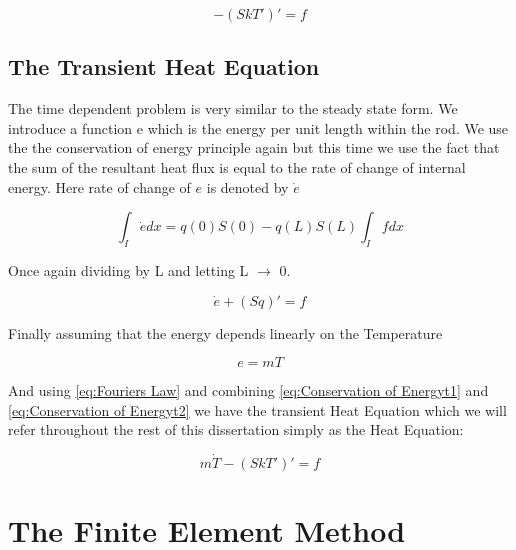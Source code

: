 \documentclass{uonmathreport}
\theoremstyle{definition}
\theoremstyle{problem}
\theoremstyle{theorem}
\begin{document}
\begin{equation}
-(SkT')'= f 	\label{eq:Steady State Heat Equation}
\end{equation}


\subsection{The Transient Heat Equation} \label{subsec:Time Dependent Heat Equation}

The time dependent problem is very similar to the steady state form. We introduce a function e which is the energy per unit length within the rod. We use the the conservation of energy principle again but this time we use the fact that the sum of the resultant heat flux is equal to the rate of change of internal energy. Here rate of change of $e$ is denoted by $\dot{e}$

\begin{equation}
\int_I  \dot{e} dx =   q(0)S(0) - q(L)S(L)  \int_I  f  dx	\label{eq:Conservation of Energyt1}
\end{equation}

Once again dividing by L and letting L $\rightarrow$ 0.

\begin{equation}
\dot{e} + (Sq)' = f	\label{eq:Conservation of Energyt2}
\end{equation}

Finally assuming that the energy depends linearly on the Temperature

\begin{equation}
e = mT	\label{eq:Energy and Heat}
\end{equation}

And using \eqref{eq:Fouriers Law} and combining \eqref{eq:Conservation of Energyt1} and \eqref{eq:Conservation of Energyt2} we have the transient Heat Equation which we will refer throughout the rest of this dissertation simply as the Heat Equation:

 \begin{equation}
m\dot{T} - (SkT')' = f	\label{eq:Heat Equation}
\end{equation}


\clearpage

\clearpage

\section{The Finite Element Method} \label{sec:FEM}
\end{document}
